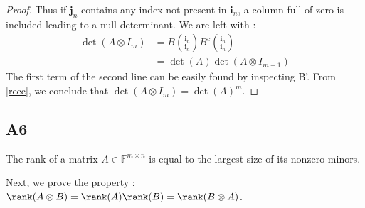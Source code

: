 \documentclass[11pt]{article}
\newcommand{\field}{\mathbb{F}} %
\newcommand{\kp}{\otimes} %
\begin{document}
\begin{proof}
Thus if $\bm{j}_n$ contains any index not present in $\bm{i}_n$, a column full of zero is included leading to a null determinant. We are left with :
\begin{align}
\det(A \kp I_m) &= B {\bm{i}_n\choose \bm{i}_n} B^c {\bm{i}_n\choose \bm{i}_n}\\ \label{recc}
&= \det(A) \det(A \kp I_{m-1})
\end{align}
The first term of the second line can be easily found by inspecting B'.
From \ref{recc}, we conclude that \(\det(A \kp I_m) = \det(A)^m\).
\end{proof}

\subsection*{A6}
The rank of a matrix \(A \in \field^{m \times n}\) is equal to the largest size of its nonzero minors.

Next, we prove the property : $\rank(A\kp B)=\rank(A)\rank(B)=\rank(B\kp A)$.
\end{document}
